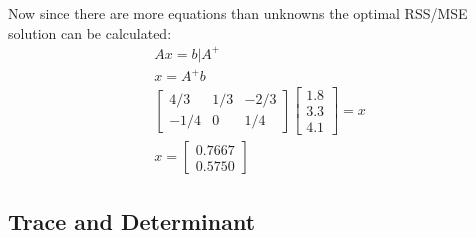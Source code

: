 \documentclass[../Main.tex]{subfiles}
\begin{document}
{    Now since there are more equations than 
    unknowns the optimal RSS/MSE solution can be calculated:
    \begin{equation*}
        \begin{split}
            Ax = b | A^+\\
            x = A^+ b \\
            \begin{bmatrix}
                4/3 & 1/3 & -2/3 \\
                 -1/4 & 0 & 1/4
             \end{bmatrix} \begin{bmatrix}
                1.8 \\
                3.3 \\
                4.1
            \end{bmatrix} = x \\
            x = \begin{bmatrix}
                0.7667 \\
                0.5750
            \end{bmatrix}
        \end{split}
    \end{equation*}
}

\subsection{Trace and Determinant}

\end{document}
